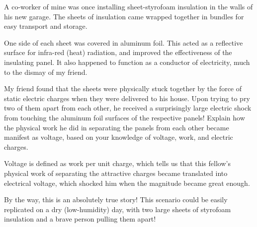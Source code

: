

A co-worker of mine was once installing sheet-styrofoam insulation in the walls of his new garage.  The sheets of insulation came wrapped together in bundles for easy transport and storage.

One side of each sheet was covered in aluminum foil.  This acted as a reflective surface for infra-red (heat) radiation, and improved the effectiveness of the insulating panel.  It also happened to function as a conductor of electricity, much to the dismay of my friend.

My friend found that the sheets were physically stuck together by the force of static electric charges when they were delivered to his house.  Upon trying to pry two of them apart from each other, he received a surprisingly large electric shock from touching the aluminum foil surfaces of the respective panels!  Explain how the physical work he did in separating the panels from each other became manifest as voltage, based on your knowledge of voltage, work, and electric charges.







Voltage is defined as work per unit charge, which tells us that this fellow's physical work of separating the attractive charges became translated into electrical voltage, which shocked him when the magnitude became great enough.







By the way, this is an absolutely true story!  This scenario could be easily replicated on a dry (low-humidity) day, with two large sheets of styrofoam insulation and a brave person pulling them apart!




